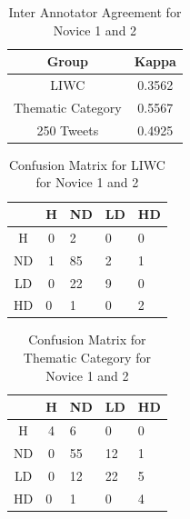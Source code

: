 \documentclass[11pt]{article}
\begin{document}
\begin{table}[h]
 \centering
\begin{tabular}{|c|c|}
\hline
\textbf{Group}                    & \textbf{Kappa}  \\ \hline
LIWC              & 0.3562 \\ \hline
Thematic Category & 0.5567 \\ \hline
250 Tweets               & 0.4925 \\ \hline
\end{tabular}
\caption {Inter Annotator Agreement for Novice 1 and 2}
\end{table}


\begin{table}[h]
\centering
\begin{tabular}{c|c|l|l|l|}
\cline{2-5}
                         & H                       & ND & LD & HD \\ \hline
\multicolumn{1}{|c|}{H}  & 0                       & 2  & 0  & 0  \\ \hline
\multicolumn{1}{|c|}{ND} & 1                       & 85 & 2  & 1  \\ \hline
\multicolumn{1}{|c|}{LD} & 0                       & 22 & 9  & 0  \\ \hline
\multicolumn{1}{|l}{HD}  & \multicolumn{1}{|l|}{0} & 1  & 0  & 2  \\ \hline
\end{tabular}
\caption {Confusion Matrix for LIWC for Novice 1 and 2}
\end{table}

\begin{table}[h]
\centering
\begin{tabular}{c|c|l|l|l|}
\cline{2-5}
                         & H                       & ND & LD & HD \\ \hline
\multicolumn{1}{|c|}{H}  & 4                       & 6  & 0  & 0  \\ \hline
\multicolumn{1}{|c|}{ND} & 0                       & 55 & 12 & 1  \\ \hline
\multicolumn{1}{|c|}{LD} & 0                       & 12 & 22 & 5  \\ \hline
\multicolumn{1}{|l}{HD}  & \multicolumn{1}{|l|}{0} & 1  & 0  & 4  \\ \hline
\end{tabular}
\caption {Confusion Matrix for Thematic Category for Novice 1 and 2}
\end{table}
\end{document}
